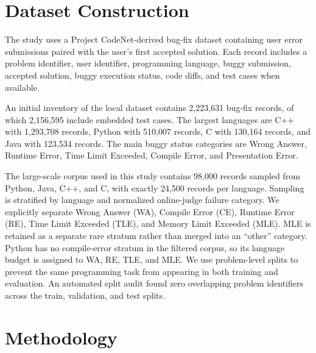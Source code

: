 \documentclass[conference]{IEEEtran}
\begin{document}
\section{Dataset Construction}

The study uses a Project CodeNet-derived bug-fix dataset containing user error submissions paired with the user's first accepted solution. Each record includes a problem identifier, user identifier, programming language, buggy submission, accepted solution, buggy execution status, code diffs, and test cases when available.

An initial inventory of the local dataset contains 2,223,631 bug-fix records, of which 2,156,595 include embedded test cases. The largest languages are C++ with 1,293,708 records, Python with 510,007 records, C with 130,164 records, and Java with 123,534 records. The main buggy status categories are Wrong Answer, Runtime Error, Time Limit Exceeded, Compile Error, and Presentation Error.

The large-scale corpus used in this study contains 98,000 records sampled from Python, Java, C++, and C, with exactly 24,500 records per language. Sampling is stratified by language and normalized online-judge failure category. We explicitly separate Wrong Answer (WA), Compile Error (CE), Runtime Error (RE), Time Limit Exceeded (TLE), and Memory Limit Exceeded (MLE). MLE is retained as a separate rare stratum rather than merged into an ``other'' category. Python has no compile-error stratum in the filtered corpus, so its language budget is assigned to WA, RE, TLE, and MLE. We use problem-level splits to prevent the same programming task from appearing in both training and evaluation. An automated split audit found zero overlapping problem identifiers across the train, validation, and test splits.









\section{Methodology}
\end{document}
